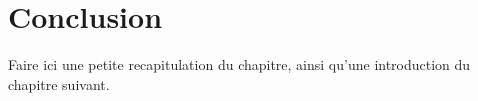 \begin{spacing}{1.2}
\begin{itemize}
\end{itemize}

\section*{Conclusion}
Faire ici une petite recapitulation du chapitre, ainsi qu'une introduction du chapitre suivant.





\end{spacing}
